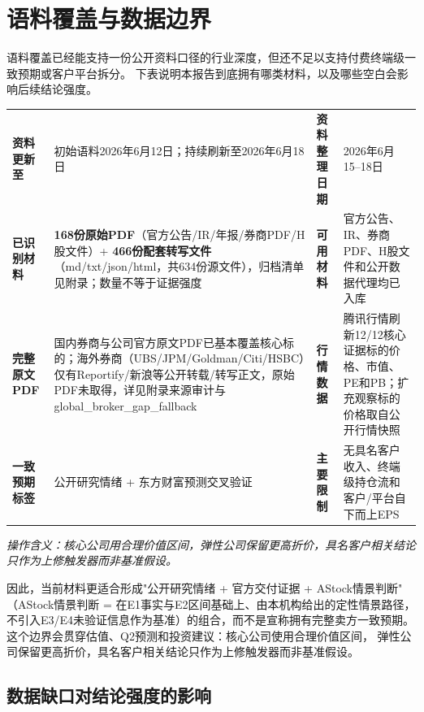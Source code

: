 \section{语料覆盖与数据边界}

语料覆盖已经能支持一份公开资料口径的行业深度，但还不足以支持付费终端级一致预期或客户平台拆分。
下表说明本报告到底拥有哪类材料，以及哪些空白会影响后续结论强度。

\begin{dashboardbox}
\small
\begin{tabularx}{\textwidth}{L{2.8cm}X L{2.8cm}X}
\toprule
\textbf{资料更新至} & 初始语料2026年6月12日；持续刷新至2026年6月18日 & \textbf{资料整理日期} & 2026年6月15--18日 \\
\textbf{已识别材料} & \textbf{168份原始PDF}（官方公告/IR/年报/券商PDF/H股文件）+ \textbf{466份配套转写文件}（md/txt/json/html，共634份源文件），归档清单见附录；数量不等于证据强度 & \textbf{可用材料} & 官方公告、IR、券商PDF、H股文件和公开数据代理均已入库 \\
\textbf{完整原文PDF} & 国内券商与公司官方原文PDF已基本覆盖核心标的；海外券商（UBS/JPM/Goldman/Citi/HSBC）仅有Reportify/新浪等公开转载/转写正文，原始PDF未取得，详见附录来源审计与global\_broker\_gap\_fallback & \textbf{行情数据} & 腾讯行情刷新12/12核心证据标的价格、市值、PE和PB；扩充观察标的价格取自公开行情快照 \\
\textbf{一致预期标签} & 公开研究情绪 + 东方财富预测交叉验证 & \textbf{主要限制} & 无具名客户收入、终端级持仓流和客户/平台自下而上EPS \\
\bottomrule
\end{tabularx}
\par\medskip
\textit{操作含义：核心公司用合理价值区间，弹性公司保留更高折价，具名客户相关结论只作为上修触发器而非基准假设。}
\end{dashboardbox}

因此，当前材料更适合形成"公开研究情绪 + 官方交付证据 + AStock情景判断"
（AStock情景判断 = 在E1事实与E2区间基础上、由本机构给出的定性情景路径，
不引入E3/E4未验证信息作为基准）的组合，而不是宣称拥有完整卖方一致预期。
这个边界会贯穿估值、Q2预测和投资建议：核心公司使用合理价值区间，
弹性公司保留更高折价，具名客户相关结论只作为上修触发器而非基准假设。

\subsection{数据缺口对结论强度的影响}

